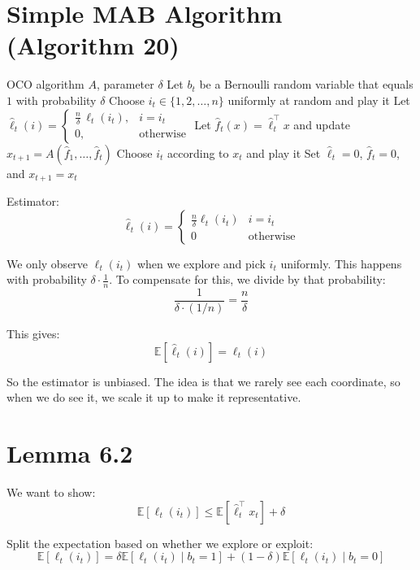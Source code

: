 \documentclass{article}
\begin{document}
\section{Simple MAB Algorithm (Algorithm 20)}

\begin{algorithm}
\caption{Simple MAB algorithm}
\begin{algorithmic}[1]
\REQUIRE OCO algorithm $A$, parameter $\delta$
    \STATE Let $b_t$ be a Bernoulli random variable that equals $1$ with probability $\delta$
        \STATE Choose $i_t \in \{1,2,\dots,n\}$ uniformly at random and play it
        \STATE Let
        $
        \hat{\ell}_t(i) =
        \begin{cases}
        \frac{n}{\delta}\,\ell_t(i_t), & i = i_t \\
        0, & \text{otherwise}
        \end{cases}
        $
        \STATE Let $\hat{f}_t(x) = \hat{\ell}_t^\top x$ and update $x_{t+1} = A(\hat{f}_1,\dots,\hat{f}_t)$
    \ELSE
        \STATE Choose $i_t$ according to $x_t$ and play it
        \STATE Set $\hat{\ell}_t = 0$, $\hat{f}_t = 0$, and $x_{t+1} = x_t$
    \ENDIF
\ENDFOR
\end{algorithmic}
\end{algorithm}

Estimator:
\[
\hat{\ell}_t(i) =
\begin{cases}
\frac{n}{\delta} \ell_t(i_t) & i = i_t \\
0 & \text{otherwise}
\end{cases}
\]

We only observe $\ell_t(i_t)$ when we explore and pick $i_t$ uniformly. This happens with probability $\delta \cdot \frac{1}{n}$. To compensate for this, we divide by that probability:
\[
\frac{1}{\delta \cdot (1/n)} = \frac{n}{\delta}
\]

This gives:
\[
\mathbb{E}[\hat{\ell}_t(i)] = \ell_t(i)
\]

So the estimator is unbiased. The idea is that we rarely see each coordinate, so when we do see it, we scale it up to make it representative.

\section{Lemma 6.2}

We want to show:
\[
\mathbb{E}[\ell_t(i_t)] \le \mathbb{E}[\hat{\ell}_t^\top x_t] + \delta
\]

Split the expectation based on whether we explore or exploit:
\[
\mathbb{E}[\ell_t(i_t)] = \delta \mathbb{E}[\ell_t(i_t)\mid b_t=1] + (1-\delta)\mathbb{E}[\ell_t(i_t)\mid b_t=0]
\]
\end{document}
